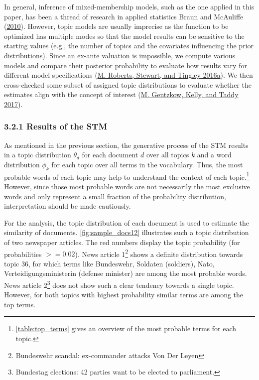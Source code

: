 \documentclass[
  12pt,
]{article}
\begin{document}
In general, inference of mixed-membership models, such as the one
applied in this paper, has been a thread of research in applied
statistics Braun and McAuliffe
(\protect\hyperlink{ref-braun_variational_2010}{2010}). However, topic
models are usually imprecise as the function to be optimized has
multiple modes so that the model results can be sensitive to the
starting values (e.g., the number of topics and the covariates
influencing the prior distributions). Since an ex-ante valuation is
impossible, we compute various models and compare their posterior
probability to evaluate how results vary for different model
specifications (\protect\hyperlink{ref-roberts_navigating_2016}{M.
Roberts, Stewart, and Tingley 2016a}). We then cross-checked some subset
of assigned topic distributions to evaluate whether the estimates align
with the concept of interest
(\protect\hyperlink{ref-gentzkow_text_2017}{M. Gentzkow, Kelly, and
Taddy 2017}).

\hypertarget{results-of-the-stm}{%
\subsubsection{3.2.1 Results of the STM}\label{results-of-the-stm}}

As mentioned in the previous section, the generative process of the STM
results in a topic distribution \(\theta_d\) for each document \(d\)
over all topics \(k\) and a word distribution \(\phi_k\) for each topic
over all terms in the vocabulary. Thus, the most probable words of each
topic may help to understand the context of each topic.\footnote{\autoref{table:top_terms}
  gives an overview of the most probable terms for each topic.} However,
since those most probable words are not necessarily the most exclusive
words and only represent a small fraction of the probability
distribution, interpretation should be made cautiously.

For the analysis, the topic distribution of each document is used to
estimate the similarity of documents. \autoref{fig:sample_docs12}
illustrates such a topic distribution of two newspaper articles. The red
numbers display the topic probability (for probabilities \(>= 0.02\)).
News article 1\footnote{Bundeswehr scandal: ex-commander attacks Von Der
  Leyen} shows a definite distribution towards topic 36, for which terms
like Bundeswehr, Soldaten (soldiers), Nato, Verteidigungsministerin
(defense minister) are among the most probable words. News article
2\footnote{Bundestag elections: 42 parties want to be elected to
  parliament.} does not show such a clear tendency towards a single
topic. However, for both topics with highest probability similar terms
are among the top terms.
\end{document}
